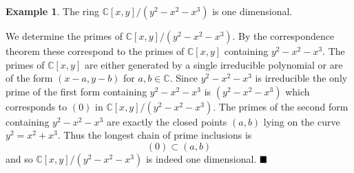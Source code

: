 \documentclass{article}
\newcommand{\C}{\ensuremath{\mathbb{C}}}
\theoremstyle{definition}
\newcounter{dummy} \numberwithin{dummy}{section}
\newtheorem{example}[dummy]{Example}
\begin{document}
\begin{example}
  The ring $\C[x,y]/(y^2-x^2-x^3)$ is one dimensional.
\end{example}
\noindent
We determine the primes of $\C[x,y]/(y^2-x^2-x^3)$.
By the correspondence theorem these correspond to the primes of $\C[x,y]$ containing $y^2-x^2-x^3$.
The primes of $\C[x,y]$ are either generated by a single irreducible polynomial or are of the form $(x-a,y-b)$ for $a,b \in \C$.
Since $y^2-x^2-x^3$ is irreducible the only prime of the first form containing $y^2-x^2-x^3$ is $(y^2-x^2-x^3)$ which corresponds to $(0)$ in $\C[x,y]/(y^2-x^2-x^3)$.
The primes of the second form containing $y^2-x^2-x^3$ are exactly the closed points $(a,b)$ lying on the curve $y^2=x^2+x^3$.
Thus the longest chain of prime inclusions is
$$ (0) \subset (a,b)$$
and so $\C[x,y]/(y^2-x^2-x^3)$ is indeed one dimensional.
$\hfill\blacksquare$
\end{document}
